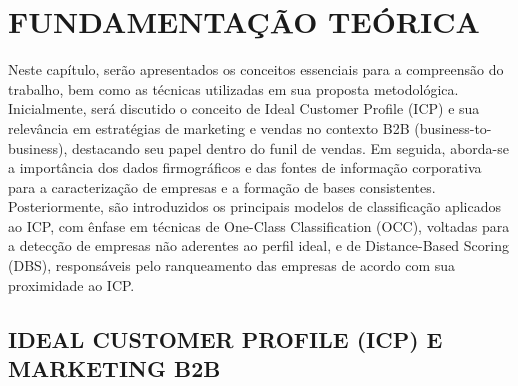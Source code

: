 \chapter{FUNDAMENTAÇÃO TEÓRICA}

Neste capítulo, serão apresentados os conceitos essenciais para a compreensão do trabalho, bem como as técnicas utilizadas em sua proposta metodológica. Inicialmente, será discutido o conceito de Ideal Customer Profile (ICP) e sua relevância em estratégias de marketing e vendas no contexto B2B (business-to-business), destacando seu papel dentro do funil de vendas. Em seguida, aborda-se a importância dos dados firmográficos e das fontes de informação corporativa para a caracterização de empresas e a formação de bases consistentes. Posteriormente, são introduzidos os principais modelos de classificação aplicados ao ICP, com ênfase em técnicas de One-Class Classification (OCC), voltadas para a detecção de empresas não aderentes ao perfil ideal, e de Distance-Based Scoring (DBS), responsáveis pelo ranqueamento das empresas de acordo com sua proximidade ao ICP.

\section{IDEAL CUSTOMER PROFILE (ICP) E MARKETING B2B}

